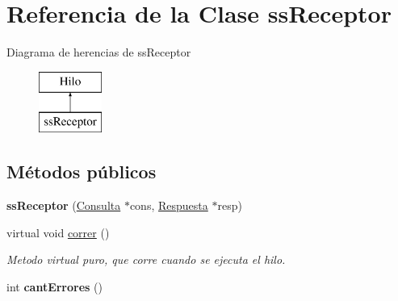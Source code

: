 \hypertarget{classssReceptor}{\section{\-Referencia de la \-Clase ss\-Receptor}
\label{classssReceptor}
}
\-Diagrama de herencias de ss\-Receptor\begin{figure}[H]
\begin{center}
\leavevmode
\includegraphics[height=2.000000cm]{classssReceptor}
\end{center}
\end{figure}
\subsection*{\-Métodos públicos}
\begin{DoxyCompactItemize}
\item 
\hypertarget{classssReceptor_a91f620b7c0520b0bb9d176c434d07c6d}{{\bfseries ss\-Receptor} (\hyperlink{classConsulta}{\-Consulta} $\ast$cons, \hyperlink{classRespuesta}{\-Respuesta} $\ast$resp)}\label{classssReceptor_a91f620b7c0520b0bb9d176c434d07c6d}

\item 
\hypertarget{classssReceptor_a712ee81f47b9e1449081a0de71da6792}{virtual void \hyperlink{classssReceptor_a712ee81f47b9e1449081a0de71da6792}{correr} ()}\label{classssReceptor_a712ee81f47b9e1449081a0de71da6792}

\begin{DoxyCompactList}\small\item\em \-Metodo virtual puro, que corre cuando se ejecuta el hilo. \end{DoxyCompactList}\item 
\hypertarget{classssReceptor_ae2b99c9f5ec9ee5b9b54cc246d0fc299}{int {\bfseries cant\-Errores} ()}\label{classssReceptor_ae2b99c9f5ec9ee5b9b54cc246d0fc299}

\end{DoxyCompactItemize}
